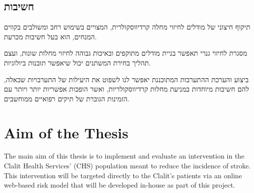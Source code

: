 \documentclass[a4paper,12pt]{article}
\begin{document}
\begin{hebrew}
		\subsection*{חשיבות}
			תיקוף חיצוני של מודלים לחיזוי מחלה קרדיווסקולרית, המצויים בשימוש רחב ומשולבים בקווים המנחים, הוא בעל חשיבות מכרעת\cite{Collins2015}.
			
			מסגרת לחיזוי גנרי תאפשר בניית מודלים מתוקפים ובאיכות גבוהה לחיזוי מחלות שונות, ועצם תהליך בחירת המשתנים יכול שיאפשר תובנות ביולוגיות.
			
			ביצוע והערכת ההתערבות המתוכננת יאפשר לנו לשפוט את היעילות של התערבויות שכאלה, להם חשיבות מיוחדות במניעת מחלות קרדיווסקולריות\cite{Riegel2017}, ואשר הופכות אפשריות יותר ויותר עם הזמינות הגוברת של תיקים רפואיים ממוחשבים.
		
	\end{hebrew}
	
	\section{Aim of the Thesis}
	The main aim of this thesis is to implement and evaluate an intervention in the Clalit Health Services' (CHS) population meant to reduce the incidence of stroke. This intervention will be targeted directly to the Clalit's patients via an online web-based risk model that will be developed in-house as part of this project.
	
\end{document}
